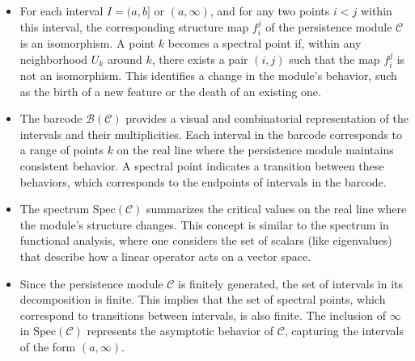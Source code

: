 \begin{remark}\noindent
\begin{itemize}
    \item For each interval $I = (a,b]$ or $(a,\infty)$, and for any two points $i < j$ within this interval, the corresponding structure map $f_{i}^j$ of the persistence module $\mathcal{C}$ is an isomorphism. A point $k$ becomes a spectral point if, within any neighborhood $U_k$ around $k$, there exists a pair $(i, j)$ such that the map $f_{i}^j$ is not an isomorphism. This identifies a change in the module's behavior, such as the birth of a new feature or the death of an existing one.
    \item The barcode $\mathcal{B}(\mathcal{C})$ provides a visual and combinatorial representation of the intervals and their multiplicities. Each interval in the barcode corresponds to a range of points $k$ on the real line where the persistence module maintains consistent behavior. A spectral point indicates a transition between these behaviors, which corresponds to the endpoints of intervals in the barcode.
    \item The spectrum $\text{Spec}(\mathcal{C})$ summarizes the critical values on the real line where the module's structure changes. This concept is similar to the spectrum in functional analysis, where one considers the set of scalars (like eigenvalues) that describe how a linear operator acts on a vector space.
    \item Since the persistence module $\mathcal{C}$ is finitely generated, the set of intervals in its decomposition is finite. This implies that the set of spectral points, which correspond to transitions between intervals, is also finite. The inclusion of $\infty$ in $\text{Spec}(\mathcal{C})$ represents the asymptotic behavior of $\mathcal{C}$, capturing the intervals of the form $(a, \infty)$.
\end{itemize}
\end{remark}

